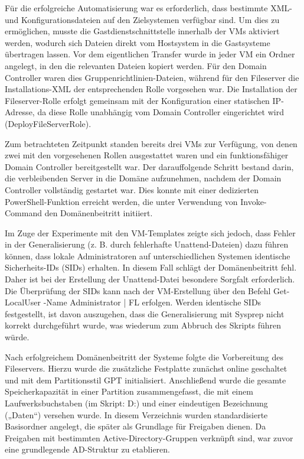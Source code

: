 \documentclass[conference]{IEEEtran}
\begin{document}
Für die erfolgreiche Automatisierung war es erforderlich, dass bestimmte XML- und Konfigurationsdateien auf den Zielsystemen verfügbar sind. Um dies zu ermöglichen, musste die Gastdienstschnittstelle innerhalb der VMs aktiviert werden, wodurch sich Dateien direkt vom Hostsystem in die Gastsysteme übertragen lassen. Vor dem eigentlichen Transfer wurde in jeder VM ein Ordner angelegt, in den die relevanten Dateien kopiert werden. Für den Domain Controller waren dies Gruppenrichtlinien-Dateien, während für den Fileserver die Installations-XML der entsprechenden Rolle vorgesehen war. Die Installation der Fileserver-Rolle erfolgt gemeinsam mit der Konfiguration einer statischen IP-Adresse, da diese Rolle unabhängig vom Domain Controller eingerichtet wird (DeployFileServerRole).

Zum betrachteten Zeitpunkt standen bereits drei VMs zur Verfügung, von denen zwei mit den vorgesehenen Rollen ausgestattet waren und ein funktionsfähiger Domain Controller bereitgestellt war. Der darauffolgende Schritt bestand darin, die verbleibenden Server in die Domäne aufzunehmen, nachdem der Domain Controller vollständig gestartet war. Dies konnte mit einer dedizierten PowerShell-Funktion erreicht werden, die unter Verwendung von Invoke-Command den Domänenbeitritt initiiert.

Im Zuge der Experimente mit den VM-Templates zeigte sich jedoch, dass Fehler in der Generalisierung (z. B. durch fehlerhafte Unattend-Dateien) dazu führen können, dass lokale Administratoren auf unterschiedlichen Systemen identische Sicherheits-IDs (SIDs) erhalten. In diesem Fall schlägt der Domänenbeitritt fehl. Daher ist bei der Erstellung der Unattend-Datei besondere Sorgfalt erforderlich. Die Überprüfung der SIDs kann nach der VM-Erstellung über den Befehl Get-LocalUser -Name Administrator | FL erfolgen. Werden identische SIDs festgestellt, ist davon auszugehen, dass die Generalisierung mit Sysprep nicht korrekt durchgeführt wurde, was wiederum zum Abbruch des Skripts führen würde.

Nach erfolgreichem Domänenbeitritt der Systeme folgte die Vorbereitung des Fileservers. Hierzu wurde die zusätzliche Festplatte zunächst online geschaltet und mit dem Partitionsstil GPT initialisiert. Anschließend wurde die gesamte Speicherkapazität in einer Partition zusammengefasst, die mit einem Laufwerksbuchstaben (im Skript: D:) und einer eindeutigen Bezeichnung („Daten“) versehen wurde. In diesem Verzeichnis wurden standardisierte Basisordner angelegt, die später als Grundlage für Freigaben dienen. Da Freigaben mit bestimmten Active-Directory-Gruppen verknüpft sind, war zuvor eine grundlegende AD-Struktur zu etablieren.
\end{document}
